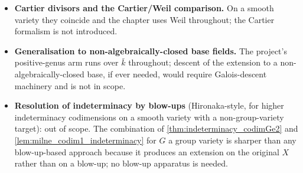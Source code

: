 \begin{itemize}
    numbers, Hartshorne~V.1) is out of scope.
  \item \textbf{Cartier divisors and the Cartier/Weil comparison.} On a smooth variety
    they coincide and the chapter uses Weil throughout; the Cartier formalism is not
    introduced.
  \item \textbf{Generalisation to non-algebraically-closed base fields.} The
    project's positive-genus arm runs over \(\bar k\) throughout; descent of the
    extension to a non-algebraically-closed base, if ever needed, would require
    Galois-descent machinery and is not in scope.
  \item \textbf{Resolution of indeterminacy by blow-ups} (Hironaka-style, for higher
    indeterminacy codimensions on a smooth variety with a non-group-variety target):
    out of scope. The combination of \cref{thm:indeterminacy_codimGe2} and
    \cref{lem:milne_codim1_indeterminacy} for \(G\) a group variety is sharper than any
    blow-up-based approach because it produces an extension on the original \(X\)
    rather than on a blow-up; no blow-up apparatus is needed.
\end{itemize}
